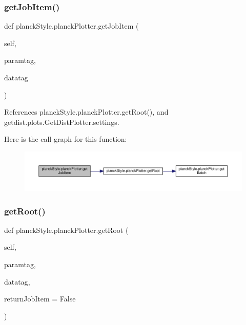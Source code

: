 \subsubsection{\texorpdfstring{get\+Job\+Item()}{getJobItem()}}
{\footnotesize\ttfamily def planck\+Style.\+planck\+Plotter.\+get\+Job\+Item (\begin{DoxyParamCaption}\item[{}]{self,  }\item[{}]{paramtag,  }\item[{}]{datatag }\end{DoxyParamCaption})}



References planck\+Style.\+planck\+Plotter.\+get\+Root(), and getdist.\+plots.\+Get\+Dist\+Plotter.\+settings.

Here is the call graph for this function\+:
\nopagebreak
\begin{figure}[H]
\begin{center}
\leavevmode
\includegraphics[width=350pt]{classplanckStyle_1_1planckPlotter_a5a2ce78f310b8ca51fc307a1c66c5e6d_cgraph}
\end{center}
\end{figure}
\mbox{\label{classplanckStyle_1_1planckPlotter_a1f04dabee2f8f9fe8c4a8fcabdedb346}} 
\subsubsection{\texorpdfstring{get\+Root()}{getRoot()}}
{\footnotesize\ttfamily def planck\+Style.\+planck\+Plotter.\+get\+Root (\begin{DoxyParamCaption}\item[{}]{self,  }\item[{}]{paramtag,  }\item[{}]{datatag,  }\item[{}]{return\+Job\+Item = {\ttfamily False} }\end{DoxyParamCaption})}



